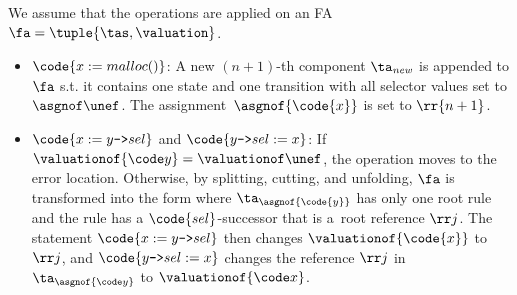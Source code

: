 {%
We assume that the operations are applied on an FA~$\fa = \tuple{\tas,\valuation}$.
		\begin{itemize}
		   \item $\code{x := malloc()}$: A new $(n+1)$-th component 
		  $\ta_{\mathit{new}}$ is appended to $\fa$ s.t. it contains one state and one transition with all
		  selector values set to $\asgnof \unef$.
      The assignment~$\asgnof{\code{x}}$ is set to $\rr{n+1}$. 

		  \item $\code{x := y\text{\texttt{->}}sel}$ and $\code{y\text{\texttt{->}}sel := x}$:
		If $\valuationof{\code y} = \valuationof\unef$, the operation moves to the error location.
        Otherwise, by splitting, cutting, and unfolding, $\fa$ is transformed into the
        form where $\ta_{\asgnof{\code{y}}}$ has only one root rule and the rule
        has a $\code{sel}$-successor that is a~root reference $\rr j$. 
        The statement
$\code{x := y\text{\texttt{->}}sel}$ then changes $\valuationof{\code{x}}$ to $\rr j$, and
$\code{y\text{\texttt{->}}sel := x}$ changes the reference $\rr j$ in $\ta_{\asgnof{\code y}}$ to $\valuationof{\code x}$.




\end{itemize}}
